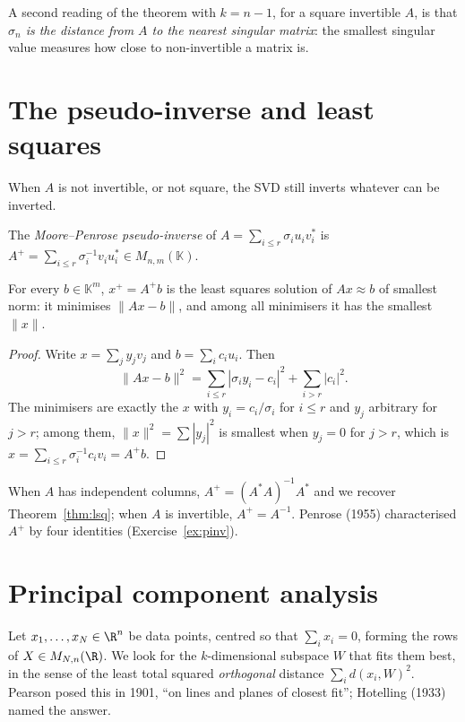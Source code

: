 A second reading of the theorem with $k=n-1$, for a square invertible $A$, is that \emph{$\sigma_n$ is the distance from $A$
to the nearest singular matrix}: the smallest singular value measures how close to non-invertible a matrix is.

\section{The pseudo-inverse and least squares}

When $A$ is not invertible, or not square, the SVD still inverts whatever can be inverted.

\begin{definition}\label{def:pinv}
The \emph{Moore--Penrose pseudo-inverse} of $A=\sum_{i\le r}\sigma_iu_iv_i^*$ is $A^+=\sum_{i\le r}\sigma_i^{-1}v_iu_i^*\in
M_{n,m}(\mathbb K)$.
\end{definition}

\begin{theorem}\label{thm:pinv}
For every $b\in\mathbb K^m$, $x^+=A^+b$ is the least squares solution of $Ax\approx b$ of smallest norm: it minimises $\|Ax-b\|$,
and among all minimisers it has the smallest $\|x\|$.
\end{theorem}
\begin{proof}
Write $x=\sum_jy_jv_j$ and $b=\sum_ic_iu_i$. Then
\[
\|Ax-b\|^2=\sum_{i\le r}|\sigma_iy_i-c_i|^2+\sum_{i>r}|c_i|^2.
\]
The minimisers are exactly the $x$ with $y_i=c_i/\sigma_i$ for $i\le r$ and $y_j$ arbitrary for $j>r$; among them,
$\|x\|^2=\sum|y_j|^2$ is smallest when $y_j=0$ for $j>r$, which is $x=\sum_{i\le r}\sigma_i^{-1}c_iv_i=A^+b$.
\end{proof}

When $A$ has independent columns, $A^+=(A^*A)^{-1}A^*$ and we recover Theorem~\ref{thm:lsq}; when $A$ is invertible,
$A^+=A^{-1}$. Penrose (1955) characterised $A^+$ by four identities (Exercise~\ref{ex:pinv}).

\section{Principal component analysis}

Let $x_1,\dots,x_N\in\R^n$ be data points, centred so that $\sum_ix_i=0$, forming the rows of $X\in M_{N,n}(\R)$. We look for
the $k$-dimensional subspace $W$ that fits them best, in the sense of the least total squared \emph{orthogonal} distance
$\sum_id(x_i,W)^2$. Pearson posed this in 1901, ``on lines and planes of closest fit''; Hotelling (1933) named the answer.

